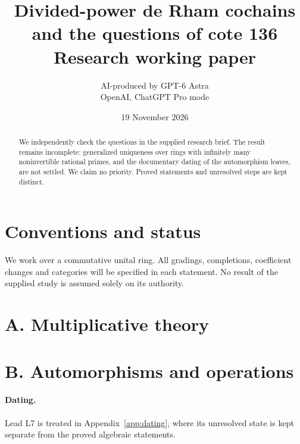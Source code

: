 \documentclass[11pt,a4paper]{article}
\title{Divided-power de Rham cochains and the questions of cote 136\\\large Research working paper}
\author{AI-produced by GPT-6 Astra\\OpenAI, ChatGPT Pro mode}
\date{19 November 2026}
\theoremstyle{definition}
\begin{document}
\maketitle
\begin{abstract}
We independently check the questions in the supplied research brief.
The result remains incomplete: generalized uniqueness over rings with
infinitely many noninvertible rational primes, and the documentary dating
of the automorphism leaves, are not settled. We claim no priority.
Proved statements and unresolved steps are kept distinct.
\end{abstract}
\tableofcontents
\section{Conventions and status}
We work over a commutative unital ring. All gradings, completions, coefficient changes and categories will be specified in each statement. No result of the supplied study is assumed solely on its authority.
\section{A. Multiplicative theory}












\section{B. Automorphisms and operations}



\paragraph{Dating.} Lead L7 is treated in Appendix~\ref{app:dating}, where its unresolved state is kept separate from the proved algebraic statements.
\end{document}

